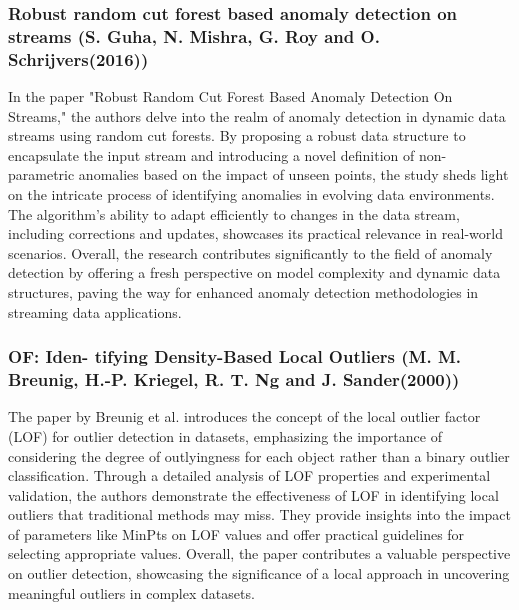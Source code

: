 \documentclass[12pt]{report}
\begin{document}
\subsubsection{Robust random cut
forest based anomaly detection on streams (S. Guha, N. Mishra, G. Roy and O. Schrijvers(2016))}
\par
In the paper "Robust Random Cut Forest Based Anomaly Detection On Streams," \cite{paper3} the authors delve into the realm of anomaly detection in dynamic data streams using random cut forests. By proposing a robust data structure to encapsulate the input stream and introducing a novel definition of non-parametric anomalies based on the impact of unseen points, the study sheds light on the intricate process of identifying anomalies in evolving data environments. The algorithm's ability to adapt efficiently to changes in the data stream, including corrections and updates, showcases its practical relevance in real-world scenarios. Overall, the research contributes significantly to the field of anomaly detection by offering a fresh perspective on model complexity and dynamic data structures, paving the way for enhanced anomaly detection methodologies in streaming data applications.
\subsubsection{OF: Iden-
tifying Density-Based Local Outliers (M. M. Breunig, H.-P. Kriegel, R. T. Ng and J. Sander(2000))}
The paper by Breunig et al\cite{paper4}. introduces the concept of the local outlier factor (LOF) for outlier detection in datasets, emphasizing the importance of considering the degree of outlyingness for each object rather than a binary outlier classification. Through a detailed analysis of LOF properties and experimental validation, the authors demonstrate the effectiveness of LOF in identifying local outliers that traditional methods may miss. They provide insights into the impact of parameters like MinPts on LOF values and offer practical guidelines for selecting appropriate values. Overall, the paper contributes a valuable perspective on outlier detection, showcasing the significance of a local approach in uncovering meaningful outliers in complex datasets.
\end{document}
